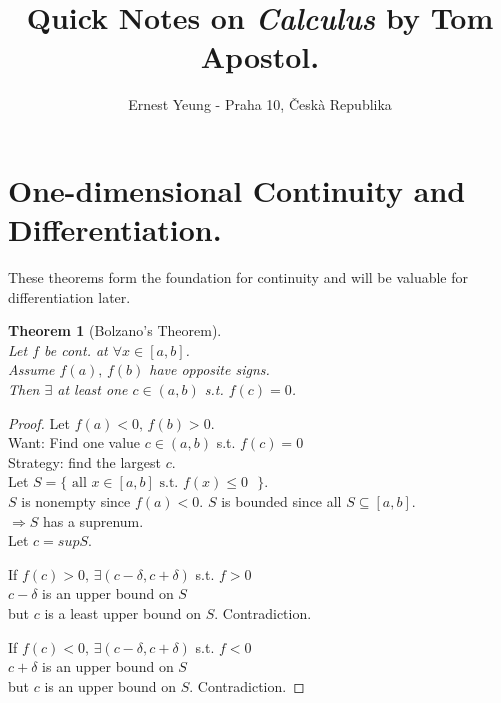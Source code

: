 \documentclass[twoside]{amsart}
\title{	Quick Notes on \emph{ Calculus } by Tom Apostol. }
\author{
  Ernest Yeung - Praha 10, \v Cesk\`a Republika 
       }
\theoremstyle{plain}
\newtheorem{theorem}{Theorem}
\theoremstyle{definition}
\begin{document}

\maketitle

\section{ One-dimensional Continuity and Differentiation. }

These theorems form the foundation for continuity and will be valuable for differentiation later.  

\begin{theorem}[Bolzano's Theorem]  \quad \\
Let $f$ be cont. at $\forall x \in [a,b]$.  \\
Assume $f(a), \, f(b)$ have opposite signs.   \\
Then $\exists$ at least one $c \in (a,b)$ s.t. $f(c) =0$.  
\end{theorem} 

\begin{proof}
  Let $f(a) < 0 , \, f(b) > 0 $.  \\
  Want: Find one value $c \in (a,b)$ s.t. $f(c)=0$ \\
  Strategy: find the largest $c$.  \\
  Let $S = \{ \text{ all $x \in [a,b]$ s.t. $f(x) \leq 0$ } \}$. \\
$S$ is nonempty since $f(a) < 0$.  $S$ is bounded since all $S \subseteq [a,b]$.  \\
  $\Longrightarrow S$ has a suprenum.  \\
Let $c = sup S$.  

If $f(c) > 0, \, \exists (c-\delta, c+\delta)$ s.t. $f>0$ \\
\phantom{ If } $c-\delta$ is an upper bound on $S$ \\
\phantom{ If c-d } but $c$ is a least upper bound on $S$.  Contradiction.  

If $f(c) < 0 , \, \exists (c-\delta, c+ \delta)$ s.t. $f<0$ \\
\phantom{ if } $c + \delta$ is an upper bound on $S$ \\
\phantom{ if c-d } but $c$ is an upper bound on $S$.  Contradiction.  
\end{proof}
\end{document}
